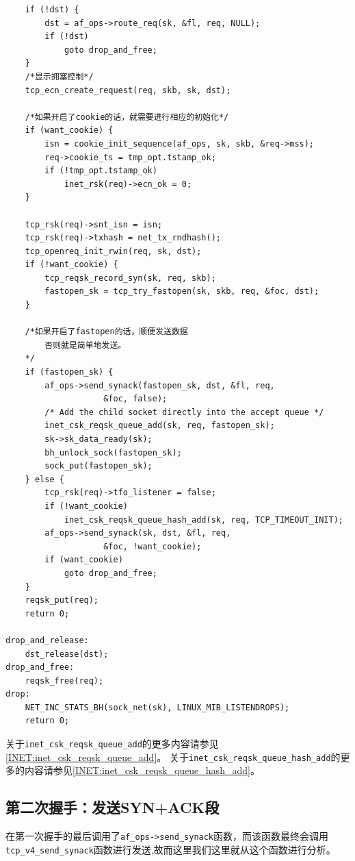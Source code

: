 \begin{verbatim}
    if (!dst) {
        dst = af_ops->route_req(sk, &fl, req, NULL);
        if (!dst)
            goto drop_and_free;
    }
    /*显示拥塞控制*/
    tcp_ecn_create_request(req, skb, sk, dst);

    /*如果开启了cookie的话，就需要进行相应的初始化*/
    if (want_cookie) {
        isn = cookie_init_sequence(af_ops, sk, skb, &req->mss);
        req->cookie_ts = tmp_opt.tstamp_ok;
        if (!tmp_opt.tstamp_ok)
            inet_rsk(req)->ecn_ok = 0;
    }

    tcp_rsk(req)->snt_isn = isn;
    tcp_rsk(req)->txhash = net_tx_rndhash();
    tcp_openreq_init_rwin(req, sk, dst);
    if (!want_cookie) {
        tcp_reqsk_record_syn(sk, req, skb);
        fastopen_sk = tcp_try_fastopen(sk, skb, req, &foc, dst);
    }

    /*如果开启了fastopen的话，顺便发送数据
        否则就是简单地发送。
    */
    if (fastopen_sk) {
        af_ops->send_synack(fastopen_sk, dst, &fl, req,
                    &foc, false);
        /* Add the child socket directly into the accept queue */
        inet_csk_reqsk_queue_add(sk, req, fastopen_sk);
        sk->sk_data_ready(sk);
        bh_unlock_sock(fastopen_sk);
        sock_put(fastopen_sk);
    } else {
        tcp_rsk(req)->tfo_listener = false;
        if (!want_cookie)
            inet_csk_reqsk_queue_hash_add(sk, req, TCP_TIMEOUT_INIT);
        af_ops->send_synack(sk, dst, &fl, req,
                    &foc, !want_cookie);
        if (want_cookie)
            goto drop_and_free;
    }
    reqsk_put(req);
    return 0;

drop_and_release:
    dst_release(dst);
drop_and_free:
    reqsk_free(req);
drop:
    NET_INC_STATS_BH(sock_net(sk), LINUX_MIB_LISTENDROPS);
    return 0;
\end{verbatim}

            关于\texttt{inet_csk_reqsk_queue_add}的更多内容请参见\ref{INET:inet_csk_reqsk_queue_add}。
            关于\texttt{inet_csk_reqsk_queue_hash_add}的更多的内容请参见\ref{INET:inet_csk_reqsk_queue_hash_add}。


        \subsection{第二次握手：发送SYN+ACK段}
            在第一次握手的最后调用了\texttt{af_ops->send_synack}函数，而该函数最终会调用\texttt{tcp_v4_send_synack}函数进行发送,故而这里我们这里就从这个函数进行分析。
